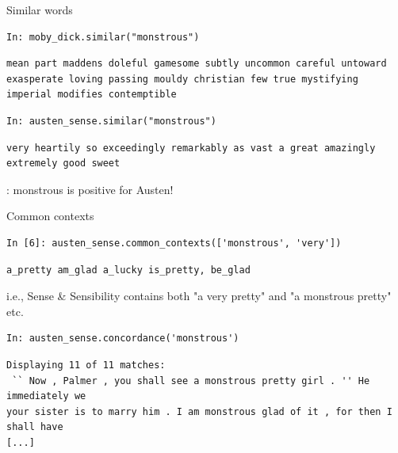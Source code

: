 \documentclass[aspectratio=169,usenames,dvipsnames]{beamer}
\begin{document}
\begin{frame}[fragile]{Similar words}
\begin{lstlisting}
In: moby_dick.similar("monstrous")
\end{lstlisting}
\begin{verbatim}
mean part maddens doleful gamesome subtly uncommon careful untoward
exasperate loving passing mouldy christian few true mystifying
imperial modifies contemptible
\end{verbatim}
\begin{lstlisting}
In: austen_sense.similar("monstrous")
\end{lstlisting}
\begin{verbatim}
very heartily so exceedingly remarkably as vast a great amazingly
extremely good sweet
\end{verbatim}

: monstrous is positive for Austen!
\end{frame}

\begin{frame}[fragile]{Common contexts}
\begin{lstlisting}
In [6]: austen_sense.common_contexts(['monstrous', 'very'])
\end{lstlisting}
\begin{verbatim}
a_pretty am_glad a_lucky is_pretty, be_glad
\end{verbatim}

\pause
i.e., Sense \& Sensibility contains both "a very pretty" and "a monstrous pretty" etc.

\begin{lstlisting}
In: austen_sense.concordance('monstrous')
\end{lstlisting}
\begin{verbatim}
Displaying 11 of 11 matches:
 `` Now , Palmer , you shall see a monstrous pretty girl . '' He immediately we
your sister is to marry him . I am monstrous glad of it , for then I shall have
[...]
\end{verbatim}
\end{frame}
\end{document}
